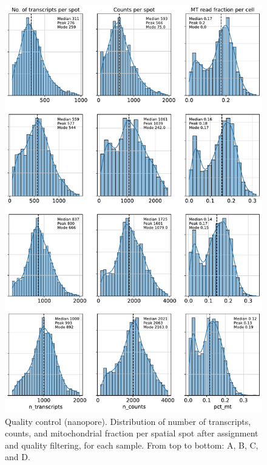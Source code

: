 \documentclass[utf8]{frontiers_suppmat} %
\begin{document}
\begin{figure}[htbp]
\begin{center}
\includegraphics[width=.75\textwidth]{figS2}%
\end{center}
\caption{Quality control (nanopore). Distribution of number of transcripts, counts, and mitochondrial fraction per spatial spot after assignment and quality filtering, for each sample. From top to bottom: A, B, C, and D.}\label{fig:S2}
\end{figure}
\end{document}
